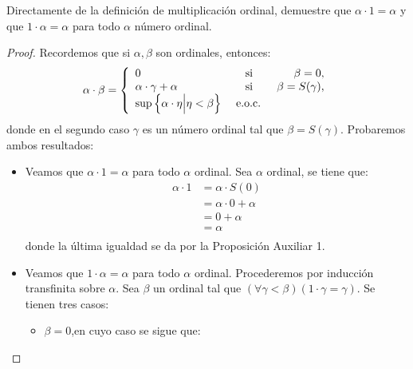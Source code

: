 \documentclass[12pt]{article}
\newcounter{it}
\theoremstyle{largebreak}
\begin{document}
    \begin{excer}
        Directamente de la definición de multiplicación ordinal, demuestre que $\alpha\cdot1=\alpha$ y que $1\cdot\alpha=\alpha$ para todo $\alpha$ número ordinal.
    \end{excer}

    \begin{proof}
        Recordemos que si $\alpha,\beta$ son ordinales, entonces:
        \begin{equation*}
            \alpha\cdot\beta=\left\{
                \begin{array}{lcr}
                    0 & \textup{ si } & \beta=0,\\
                    \alpha\cdot\gamma+\alpha & \textup{ si } & \beta=S(\gamma),\\
                    \sup\left\{\alpha\cdot\eta\Big|\eta<\beta \right\} & \textup{ e.o.c. }
                \end{array}
            \right.
        \end{equation*}
        donde en el segundo caso $\gamma$ es un número ordinal tal que $\beta=S(\gamma)$. Probaremos ambos resultados:
        \begin{itemize}
            \item Veamos que $\alpha\cdot1=\alpha$ para todo $\alpha$ ordinal. Sea $\alpha$ ordinal, se tiene que:
            \begin{equation*}
                \begin{split}
                    \alpha\cdot1&=\alpha\cdot S(0)\\
                    &=\alpha\cdot0+\alpha\\
                    &=0+\alpha\\
                    &=\alpha\\
                \end{split}
            \end{equation*}
            donde la última igualdad se da por la Proposición Auxiliar 1.
            \item Veamos que $1\cdot\alpha=\alpha$ para todo $\alpha$ ordinal. Procederemos por inducción transfinita sobre $\alpha$. Sea $\beta$ un ordinal tal que $(\forall\gamma<\beta)(1\cdot\gamma=\gamma)$. Se tienen tres casos:
            \begin{itemize}
                \item $\beta=0$,en cuyo caso se sigue que:
                \begin{equation*}

\end{equation*}
\end{itemize}
\end{itemize}
\end{proof}
\end{document}
